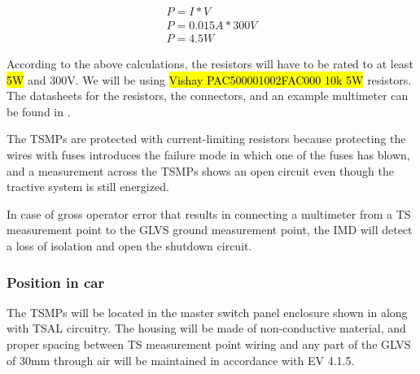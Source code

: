 \documentclass{article}
\begin{document}
\begin{align*}
P = I * V \\
P = 0.015A * 300V \\
P = 4.5W
\end{align*}

According to the above calculations, the resistors will have to be rated to at least \hl{5W} and 300V. We will be using \hl{Vishay PAC500001002FAC000 10k 5W} resistors. The datasheets for the resistors, the connectors, and an example multimeter can be found in .

The TSMPs are protected with current-limiting resistors because protecting the wires with fuses introduces the failure mode in which one of the fuses has blown, and a measurement across the TSMPs shows an open circuit even though the tractive system is still energized. 

In case of gross operator error that results in connecting a multimeter from a TS measurement point to the GLVS ground measurement point, the IMD will detect a loss of isolation and open the shutdown circuit. 

\subsubsection{Position in car}
The TSMPs will be located in the master switch panel enclosure shown in  along with TSAL circuitry. The housing will be made of non-conductive material, and proper spacing between TS measurement point wiring and any part of the GLVS of 30mm through air will be maintained in accordance with EV 4.1.5.
\end{document}

